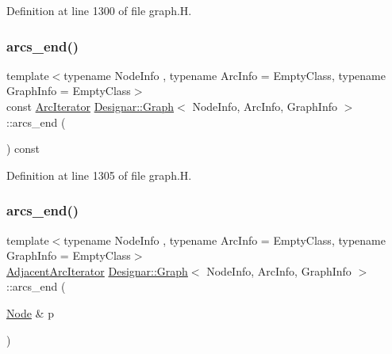 Definition at line 1300 of file graph.\+H.

\mbox{\label{class_designar_1_1_graph_a81269c52d854ceb3d000f2642fcb52ae}} 
\subsubsection{\texorpdfstring{arcs\+\_\+end()}{arcs\_end()}\hspace{0.1cm}{\footnotesize\ttfamily [2/4]}}
{\footnotesize\ttfamily template$<$typename Node\+Info , typename Arc\+Info  = Empty\+Class, typename Graph\+Info  = Empty\+Class$>$ \\
const \hyperlink{class_designar_1_1_graph_1_1_arc_iterator}{Arc\+Iterator} \hyperlink{class_designar_1_1_graph}{Designar\+::\+Graph}$<$ Node\+Info, Arc\+Info, Graph\+Info $>$\+::arcs\+\_\+end (\begin{DoxyParamCaption}{ }\end{DoxyParamCaption}) const\hspace{0.3cm}{\ttfamily [inline]}}



Definition at line 1305 of file graph.\+H.

\mbox{\label{class_designar_1_1_graph_a68ee235ab79790c00e1a69d518b9c076}} 
\subsubsection{\texorpdfstring{arcs\+\_\+end()}{arcs\_end()}\hspace{0.1cm}{\footnotesize\ttfamily [3/4]}}
{\footnotesize\ttfamily template$<$typename Node\+Info , typename Arc\+Info  = Empty\+Class, typename Graph\+Info  = Empty\+Class$>$ \\
\hyperlink{class_designar_1_1_graph_1_1_adjacent_arc_iterator}{Adjacent\+Arc\+Iterator} \hyperlink{class_designar_1_1_graph}{Designar\+::\+Graph}$<$ Node\+Info, Arc\+Info, Graph\+Info $>$\+::arcs\+\_\+end (\begin{DoxyParamCaption}\item[{\hyperlink{class_designar_1_1_graph_a5dfc7dba9d092ac489c72e40390c37d0}{Node} \&}]{p }\end{DoxyParamCaption})\hspace{0.3cm}{\ttfamily [inline]}}



